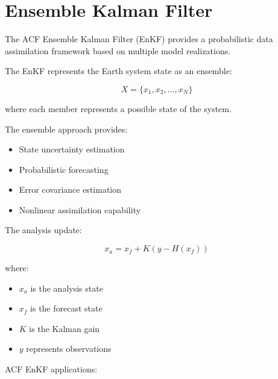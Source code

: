 \section{Ensemble Kalman Filter}



The ACF Ensemble Kalman Filter (EnKF) provides a probabilistic
data assimilation framework based on multiple model realizations.



The EnKF represents the Earth system state as an ensemble:


\[
X=
\{x_1,x_2,...,x_N\}
\]



where each member represents a possible state of the system.



The ensemble approach provides:


\begin{itemize}

\item State uncertainty estimation

\item Probabilistic forecasting

\item Error covariance estimation

\item Nonlinear assimilation capability

\end{itemize}



The analysis update:


\[
x_a=x_f+K(y-H(x_f))
\]



where:


\begin{itemize}

\item $x_a$ is the analysis state

\item $x_f$ is the forecast state

\item $K$ is the Kalman gain

\item $y$ represents observations

\end{itemize}



ACF EnKF applications:


